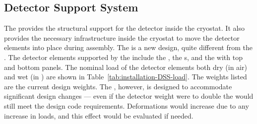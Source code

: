 \subsection{Detector Support System}
\label{sec:fdsp-tc-infr-dss}


The  provides the structural support for the detector inside the cryostat.  
It also provides the necessary infrastructure inside the cryostat to move the detector elements into place during assembly. 
The  is a new design, quite different from the  . The detector elements supported by the  include the , the s, and the  with top and bottom  panels. 
The nominal load of the detector elements both dry (in air) and wet (in ) are shown in Table~\ref{tab:installation-DSS-load}. 
The weights listed are the current design weights.  
The , however, is designed to accommodate significant design changes --- even if the detector weight were to double the  would still meet the design code requirements.  
Deformations would increase due to any increase in loads, and this effect would be evaluated if needed.

